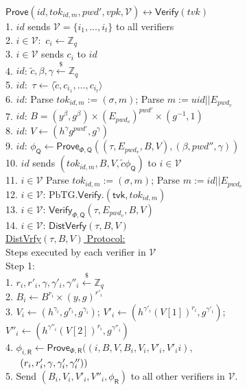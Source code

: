 \documentclass[conference]{IEEEtran}
\newcommand{\cQ}{\mathsf{Q}}
\newcommand{\cR}{\mathsf{R}}
\newcommand{\cV}{\mathcal{V}}
\newcommand{\pwd}{pwd}
\newcommand{\uid}{id}
\newcommand{\tvk}{tvk}
\newcommand{\vpk}{vpk}
\def\mg{\color{magenta}}
\begin{document}
\begin{figure}
\begin{multicols}{2}
\noindent\underline{$\mathsf{Prove}(\uid, tok_{\uid,m}, \pwd', \vpk, \cV) \longleftrightarrow \mathsf{Verify}(\tvk)$}\\
1. $\uid$ sends $\cV = \{i_{1},...,i_{t}\}$ to all verifiers\\  
2. $i \in \cV:$ $c_i \leftarrow \mathbb{Z}_q$\\
3. $i \in \cV$ sends $c_i$ to $\uid$\\
4. $\uid$: $\tilde{c}, \beta, \gamma \xleftarrow{\$} \mathbb{Z}_q$\\
5. $\uid:$ $\tau \leftarrow \langle \tilde{c}, c_{i_{1}},\ldots,c_{i_{t}} \rangle$\\
6. $\uid$: Parse $tok_{\uid,m} := (\sigma, m)$; Parse $m := uid||E_{\pwd_{v}}$\\
7. $\uid$: $B = (y^{\beta},g^{\beta}) \times (E_{\pwd_{v}})^{\pwd'} \times (g^{-1}, 1)$\\
8. $\uid$: $V \leftarrow (h^{\gamma}g^{\pwd'},g^{\gamma})$\\ 
9. $\uid$: $\phi_{\cQ} \leftarrow \mathsf{Prove}_{\Phi,\cQ}((\tau, E_{\pwd_{v}},B,V), (\beta,\pwd'',\gamma))$\\ %
10. $\uid$ sends $(tok_{\uid,m},B , V, \tilde{c} \phi_{\cQ})$ to $i \in \cV$\\ 
11. $i \in \cV$ Parse $tok_{\uid,m} := (\sigma, m)$; Parse $m := \uid||E_{\pwd_{v}}$\\
12. $i \in \cV$: $\text{PbTG}.\mathsf{Verify}.(\mathsf{tvk},tok_{\uid,m})$\\
13. $i \in \cV$: $\mathsf{Verify}_{\Phi,\cQ}(\tau,E_{\pwd_{v}},B,V)$\\
14. $i \in \cV$: $\mathsf{DistVerfy}(\tau, B, V)$\\

\noindent \underline{DistVrfy$(\tau, B, V)$ Protocol:}\\ 
Steps executed by each verifier in $\cV$\\   
\noindent Step 1:\\
        1. $r_i, r'_i,\gamma, \gamma'_i, \gamma''_i \xleftarrow{\$} \mathbb{Z}_q$\\
        2. $B_i \leftarrow B^{r_i} \times (y,g)^{r'_i}$\\ 
        3. $V_i \leftarrow (h^{\gamma_i},g^{r_i},g^{\gamma_i})$; 
        $V'_i \leftarrow (h^{\gamma'_i}(V[1])^{r_i},g^{\gamma'_i})$; 
        $V''_i \leftarrow (h^{\gamma''_i}(V[2])^{r_i},g^{\gamma''_i})$\\
        4. $\phi_{i,\cR} \leftarrow \mathsf{Prove}_{\Phi,\cR}((i,B,V,B_i,V_i,V'_i, V'_ii),$\\
        $\indent (r_i,r'_i,\gamma, \gamma'_i, \gamma''_i))$\\
        5. Send $(B_i,V_i,V'_i,V''_i, \phi_{\cR})$ to all other verifiers in $\mathcal{V}$.\\
        

\end{multicols}
\end{figure}
\end{document}
